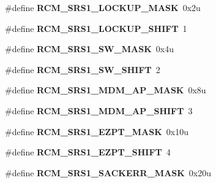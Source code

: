\begin{DoxyCompactItemize}
\item 
\#define {\bfseries R\+C\+M\+\_\+\+S\+R\+S1\+\_\+\+L\+O\+C\+K\+U\+P\+\_\+\+M\+A\+SK}~0x2u\hypertarget{group__RCM__Register__Masks_ga4f7c4ce64c13c55fc0c7aaea3a702a03}{}\label{group__RCM__Register__Masks_ga4f7c4ce64c13c55fc0c7aaea3a702a03}

\item 
\#define {\bfseries R\+C\+M\+\_\+\+S\+R\+S1\+\_\+\+L\+O\+C\+K\+U\+P\+\_\+\+S\+H\+I\+FT}~1\hypertarget{group__RCM__Register__Masks_ga71f857503a2b2d2e0c30d4762e89a8d8}{}\label{group__RCM__Register__Masks_ga71f857503a2b2d2e0c30d4762e89a8d8}

\item 
\#define {\bfseries R\+C\+M\+\_\+\+S\+R\+S1\+\_\+\+S\+W\+\_\+\+M\+A\+SK}~0x4u\hypertarget{group__RCM__Register__Masks_ga72f541acd2a0992ad0d1d089c694ad5f}{}\label{group__RCM__Register__Masks_ga72f541acd2a0992ad0d1d089c694ad5f}

\item 
\#define {\bfseries R\+C\+M\+\_\+\+S\+R\+S1\+\_\+\+S\+W\+\_\+\+S\+H\+I\+FT}~2\hypertarget{group__RCM__Register__Masks_ga7e554c1ae96dae684fbc81204283f86c}{}\label{group__RCM__Register__Masks_ga7e554c1ae96dae684fbc81204283f86c}

\item 
\#define {\bfseries R\+C\+M\+\_\+\+S\+R\+S1\+\_\+\+M\+D\+M\+\_\+\+A\+P\+\_\+\+M\+A\+SK}~0x8u\hypertarget{group__RCM__Register__Masks_ga6af4d8ed2135b602de575373f22b1af8}{}\label{group__RCM__Register__Masks_ga6af4d8ed2135b602de575373f22b1af8}

\item 
\#define {\bfseries R\+C\+M\+\_\+\+S\+R\+S1\+\_\+\+M\+D\+M\+\_\+\+A\+P\+\_\+\+S\+H\+I\+FT}~3\hypertarget{group__RCM__Register__Masks_ga91611da7546b27a939e92926f378229f}{}\label{group__RCM__Register__Masks_ga91611da7546b27a939e92926f378229f}

\item 
\#define {\bfseries R\+C\+M\+\_\+\+S\+R\+S1\+\_\+\+E\+Z\+P\+T\+\_\+\+M\+A\+SK}~0x10u\hypertarget{group__RCM__Register__Masks_gaaff7d7a53676535a98915b174b862435}{}\label{group__RCM__Register__Masks_gaaff7d7a53676535a98915b174b862435}

\item 
\#define {\bfseries R\+C\+M\+\_\+\+S\+R\+S1\+\_\+\+E\+Z\+P\+T\+\_\+\+S\+H\+I\+FT}~4\hypertarget{group__RCM__Register__Masks_ga709ca27033c866f17c9e80ccf6df88b6}{}\label{group__RCM__Register__Masks_ga709ca27033c866f17c9e80ccf6df88b6}

\item 
\#define {\bfseries R\+C\+M\+\_\+\+S\+R\+S1\+\_\+\+S\+A\+C\+K\+E\+R\+R\+\_\+\+M\+A\+SK}~0x20u\hypertarget{group__RCM__Register__Masks_gaa09459c8ed6200a5828221f9d15656d3}{}\label{group__RCM__Register__Masks_gaa09459c8ed6200a5828221f9d15656d3}


\end{DoxyCompactItemize}
